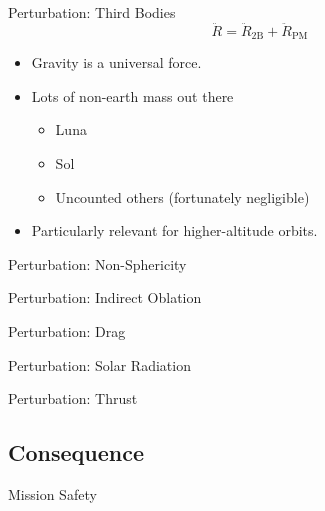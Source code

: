 \documentclass[pdf]{beamer}
\begin{document}
\begin{frame}{Perturbation: Third Bodies}
  \[ \ddot{R} = \ddot{R}_\text{2B} + \ddot{R}_\text{PM}\]

  \begin{itemize}
  \item Gravity is a universal force.
  \item Lots of non-earth mass out there
    \begin{itemize}
    \item Luna
    \item Sol
    \item Uncounted others (fortunately negligible)
    \end{itemize}
  \item Particularly relevant for higher-altitude orbits.
  \end{itemize}
\end{frame}

\begin{frame}{Perturbation: Non-Sphericity}
\end{frame}

\begin{frame}{Perturbation: Indirect Oblation}
\end{frame}

\begin{frame}{Perturbation: Drag}
\end{frame}

\begin{frame}{Perturbation: Solar Radiation}
\end{frame}

\begin{frame}{Perturbation: Thrust}
\end{frame}

\subsection{Consequence}

\begin{frame}{Mission Safety}
\end{frame}
\end{document}
